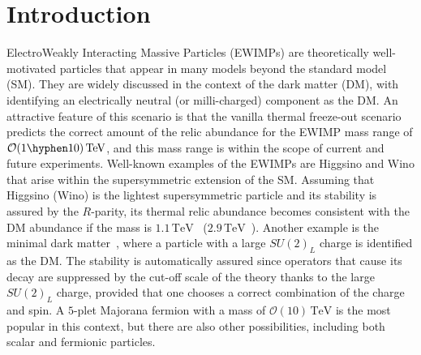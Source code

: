 \documentclass[12pt, a4paper]{article}
\begin{document}

\section{Introduction}

ElectroWeakly Interacting Massive Particles (EWIMPs) are theoretically
well-motivated particles that appear in many models beyond the
standard model (SM).  They are widely discussed in the context of the
dark matter (DM), with identifying an electrically neutral (or
milli-charged) component as the DM.  An attractive feature of this
scenario is that the vanilla thermal freeze-out scenario predicts the
correct amount of the relic abundance for the EWIMP mass range of
$\mathcal{O} (1\hyphen10)\,\mathrm{TeV}$, and this mass range is within the scope of
current and future experiments.  Well-known examples of the EWIMPs are Higgsino and
Wino that arise within the supersymmetric extension of the SM.
Assuming that Higgsino (Wino) is the lightest supersymmetric particle
and its stability is assured by the $R$-parity,
its thermal relic abundance becomes consistent with the DM abundance
if the mass is $1.1\,\mathrm{TeV}$~\cite{Cirelli:2007xd,
  ArkaniHamed:2006mb} ($2.9\,\mathrm{TeV}$~\cite{Hisano:2006nn,
  Moroi:2013sla, Beneke:2016ync, ArkaniHamed:2006mb}).
Another example is the
minimal dark matter~\cite{Cirelli:2005uq, Cirelli:2007xd,
  Cirelli:2009uv}, where a particle with a large $SU(2)_L$ charge is
identified as the DM.  The stability is automatically assured since
operators that cause its decay are suppressed by the cut-off scale of
the theory thanks to the large $SU(2)_L$ charge, provided that one
chooses a correct combination of the charge and spin.  A $5$-plet
Majorana fermion with a mass of $\mathcal{O}(10)\,\mathrm{TeV}$ is the
most popular in this context, but there are also other possibilities,
including both scalar and fermionic particles.
\end{document}
